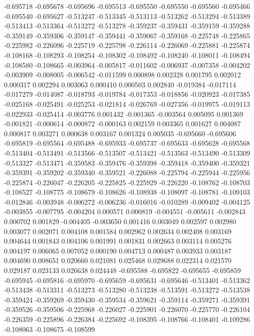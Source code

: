 -0.695718
-0.695678
-0.695696
-0.695513
-0.695550
-0.695550
-0.695560
-0.695466
-0.695540
-0.695627
-0.513247
-0.513345
-0.513113
-0.513262
-0.513294
-0.513389
-0.513413
-0.513364
-0.513272
-0.513278
-0.359237
-0.359431
-0.359159
-0.359288
-0.359149
-0.359306
-0.359147
-0.359441
-0.359067
-0.359168
-0.225748
-0.225865
-0.225982
-0.226096
-0.225719
-0.225798
-0.226114
-0.226069
-0.225881
-0.225874
-0.108168
-0.108293
-0.108254
-0.108302
-0.108492
-0.108240
-0.108011
-0.108494
-0.108580
-0.108665
-0.003964
-0.005817
-0.011602
-0.006937
-0.007358
-0.004202
-0.003909
-0.008005
-0.006542
-0.011599
0.000898
0.002328
0.001795
0.002012
0.000317
0.002294
0.003063
0.000410
0.000503
0.002840
-0.019384
-0.017114
-0.017279
-0.014087
-0.018793
-0.019784
-0.017353
-0.018856
-0.020923
-0.017385
-0.025168
-0.025491
-0.025253
-0.021814
-0.026769
-0.027356
-0.019975
-0.019113
-0.022933
-0.025414
-0.003776
0.001432
-0.001365
-0.003564
0.005095
0.001369
-0.001821
-0.000614
-0.000872
-0.000163
0.002159
0.003365
0.001627
0.004087
0.000817
0.003271
0.000638
0.003167
0.001324
0.005035
-0.695660
-0.695606
-0.695819
-0.695564
-0.695488
-0.695933
-0.695737
-0.695633
-0.695628
-0.695568
-0.513404
-0.513491
-0.513566
-0.513507
-0.513421
-0.513563
-0.513490
-0.513309
-0.513327
-0.513471
-0.359583
-0.359476
-0.359398
-0.359418
-0.359400
-0.359321
-0.359391
-0.359202
-0.359340
-0.359521
-0.226088
-0.225794
-0.225944
-0.225956
-0.225874
-0.226047
-0.226205
-0.225825
-0.225929
-0.226220
-0.108762
-0.108703
-0.108527
-0.108775
-0.108679
-0.108626
-0.108938
-0.108097
-0.108781
-0.109103
-0.012846
-0.003948
-0.006272
-0.006236
-0.016016
-0.010289
-0.009402
-0.004125
-0.003855
-0.007795
-0.004204
0.000571
0.000819
-0.004551
-0.005611
-0.002843
0.000702
0.001829
-0.004405
-0.003650
0.001416
0.003049
0.002597
0.002980
0.003077
0.002071
0.004108
0.001584
0.002962
0.002634
0.002408
0.003169
0.004644
0.001843
0.004106
0.001991
0.001831
0.002663
0.003114
0.005276
0.004197
0.006065
0.007052
0.000190
0.004713
0.000487
0.003933
0.003187
0.004690
0.008651
0.020660
0.021081
0.025468
0.029688
0.022314
0.021570
0.029187
0.023133
0.026638
0.024448
-0.695588
-0.695822
-0.695655
-0.695859
-0.695945
-0.695816
-0.695970
-0.695659
-0.695631
-0.695646
-0.513401
-0.513362
-0.513438
-0.513311
-0.513273
-0.513280
-0.513238
-0.513591
-0.513272
-0.513538
-0.359424
-0.359269
-0.359430
-0.359534
-0.359621
-0.359114
-0.359271
-0.359391
-0.359526
-0.359506
-0.225968
-0.226027
-0.225901
-0.226070
-0.225770
-0.226104
-0.226359
-0.225896
-0.226384
-0.225692
-0.108395
-0.108766
-0.108401
-0.109286
-0.108063
-0.108675
-0.108599
